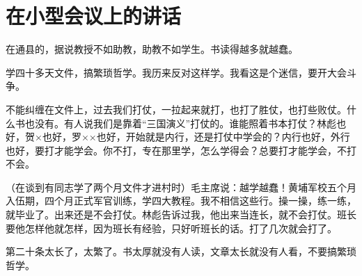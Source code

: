 \section[在小型会议上的讲话（一九六四年）]{在小型会议上的讲话}


在通县的，据说教授不如助教，助教不如学生。书读得越多就越蠢。

学四十多天文件，搞繁琐哲学。我历来反对这样学。我看这是个迷信，要开大会斗争。

不能纠缠在文件上，过去我们打仗，一拉起来就打，也打了胜仗，也打些败仗。什么书也没有。有人说我们是靠着“三国演义”打仗的。谁能照着书本打仗？林彪也好，贺×也好，罗××也好，开始就是内行，还是打仗中学会的？内行也好，外行也好，要打才能学会。你不打，专在那里学，怎么学得会？总要打才能学会，不打不会。

（在谈到有同志学了两个月文件才进村时）毛主席说：越学越蠢！黄埔军校五个月入伍期，四个月正式军官训练，学四大教程。我不相信这些行。操一操，练一练，就毕业了。出来还是不会打仗。林彪告诉过我，他出来当连长，就不会打仗。班长要他怎样他就怎样，因为班长有经验，只好听班长的话。打了几次就会打了。

第二十条太长了，太繁了。书太厚就没有人读，文章太长就没有人看，不要搞繁琐哲学。


